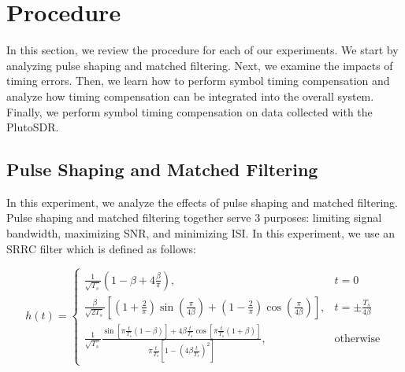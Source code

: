 \documentclass{article}
\begin{document}


\section{Procedure}

In this section, we review the procedure for each of our experiments. We start by analyzing pulse shaping and matched filtering. Next, we examine the impacts of timing errors. Then, we learn how to perform symbol timing compensation and analyze how timing compensation can be integrated into the overall system. Finally, we perform symbol timing compensation on data collected with the PlutoSDR.

\subsection{Pulse Shaping and Matched Filtering}

In this experiment, we analyze the effects of pulse shaping and matched filtering. Pulse shaping and matched filtering together serve 3 purposes: limiting signal bandwidth, maximizing SNR, and minimizing ISI. In this experiment, we use an SRRC filter which is defined as follows:

\begin{equation}
	h(t) = \begin{cases}
		\frac{1}{\sqrt{T_s}}\left(1 - \beta + 4\frac{\beta}{\pi}\right), & t = 0 \\
		\frac{\beta}{\sqrt{2T_s}}\left[\left(1 + \frac{2}{\pi}\right)\sin\left(\frac{\pi}{4\beta}\right)+ \left(1-\frac{2}{\pi}\right)\cos\left(\frac{\pi}{4\beta}\right)\right], & t = \pm\frac{T_s}{4\beta} \\
		\frac{1}{\sqrt{T_s}}\frac{\sin\left[\pi\frac{t}{T_s}(1-\beta)\right]+4\beta\frac{t}{T_s}\cos\left[\pi\frac{t}{T_s}(1+\beta)\right]}{\pi\frac{t}{T_s}\left[1 - \left(4\beta\frac{t}{T_s}\right)^2\right]}, & \text{otherwise}
	\end{cases}
	\label{eq::srrc_filter}
\end{equation}
\end{document}
